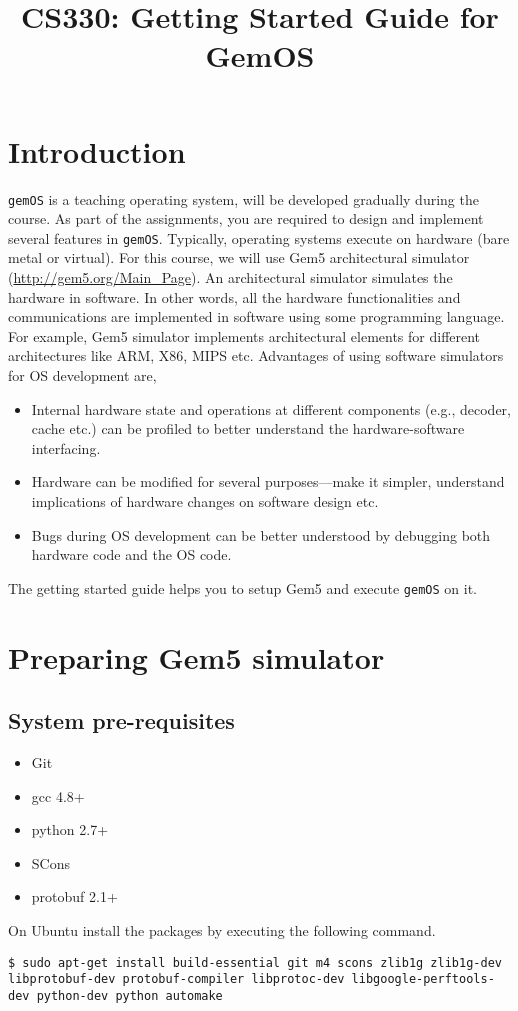 \documentclass{article}
\title{CS330: Getting Started Guide for GemOS}
\author{}
\date{}
\begin{document}
\maketitle


\section*{Introduction}
\texttt{gemOS} is a teaching operating system, will be developed gradually during the course. 
As part of the assignments, you are required to design and implement several features in \texttt{gemOS}.
%
Typically, operating systems execute on hardware (bare metal or virtual). 
For this course, we will use Gem5 architectural simulator (\url{http://gem5.org/Main_Page}).
%
An architectural simulator simulates the hardware in software. 
%
In other words, all the hardware functionalities
and communications are implemented in software using some programming language. 
%
For example, Gem5 simulator implements architectural elements for different architectures like
ARM, X86, MIPS etc.
%
Advantages of using software simulators for OS development are,
\begin{itemize}
\item Internal hardware state and operations at different components (e.g., decoder, cache etc.) can be
profiled to better understand the hardware-software interfacing.
\item Hardware can be modified for several purposes---make it simpler, understand implications of 
hardware changes on software design etc.
\item Bugs during OS development can be better understood by debugging both hardware code and the OS code.     
\end{itemize} 
%
The getting started guide helps you to setup Gem5 and execute \texttt{gemOS} on it.
\section*{Preparing Gem5 simulator}
\subsection*{System pre-requisites}
\begin{itemize}
    \item Git
    \item gcc 4.8+
    \item python 2.7+
    \item SCons
    \item protobuf 2.1+
\end{itemize}
\begin{flushleft}
On Ubuntu install the packages by executing the following command. 

\vspace{0.25cm}
\noindent
\texttt{\$ sudo apt-get install build-essential git m4 scons zlib1g zlib1g-dev libprotobuf-dev protobuf-compiler libprotoc-dev  libgoogle-perftools-dev python-dev python automake}
\end{flushleft} 
\vspace{5mm}
\end{document}
